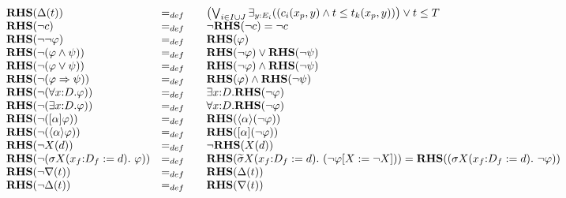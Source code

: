 \documentclass{article}
\begin{document}
\begin{equation*}
\begin{array}{lll}
{\mathbf{RHS}}(\Delta (t)) & =_{def} & \left( \bigvee_{i{\in }I\cup
J}\exists _{y{:}E_{i}}((c_{i}(x_{p},y)\wedge t\leq t_{k}(x_{p},y))\right)
\vee t\leq T \\ 
{\mathbf{RHS}}(\lnot c) & =_{def} & \lnot {\mathbf{RHS}}(\lnot c)=\lnot c \\ 
{\mathbf{RHS}}(\lnot \lnot \varphi ) & =_{def} & \mathbf{RHS}(\varphi ) \\ 
{\mathbf{RHS}}(\lnot (\varphi \wedge \psi )) & =_{def} & {\mathbf{RHS}}%
(\lnot \varphi )\vee {\mathbf{RHS}}(\lnot \psi ) \\ 
{\mathbf{RHS}}(\lnot (\varphi \vee \psi )) & =_{def} & {\mathbf{RHS}}(\lnot
\varphi )\wedge {\mathbf{RHS}}(\lnot \psi ) \\ 
{\mathbf{RHS}}(\lnot (\varphi \Rightarrow \psi )) & =_{def} & {\mathbf{RHS}}%
(\varphi )\wedge {\mathbf{RHS}}(\lnot \psi ) \\ 
{\mathbf{RHS}}(\lnot (\forall {x{:}D}.\varphi )) & =_{def} & \exists {x{:}D}.%
{\mathbf{RHS}}(\lnot \varphi ) \\ 
{\mathbf{RHS}}(\lnot (\exists {x{:}D}.\varphi )) & =_{def} & \forall {x{:}D}.%
{\mathbf{RHS}}(\lnot \varphi ) \\ 
{\mathbf{RHS}}(\lnot ([\alpha ]\varphi )) & =_{def} & {\mathbf{RHS}}(\langle
\alpha \rangle (\lnot \varphi )) \\ 
{\mathbf{RHS}}(\lnot (\langle \alpha \rangle \varphi )) & =_{def} & {\mathbf{%
RHS}}([\alpha ](\lnot \varphi )) \\ 
{\mathbf{RHS}}(\lnot X(d)) & =_{def} & \lnot {\mathbf{RHS}}(X(d)) \\ 
{\mathbf{RHS}}(\lnot (\sigma X(x_{f}{:}D_{f}:=d).~\varphi )) & =_{def}~~~ & {%
\mathbf{RHS}}(\widetilde{\sigma }X(x_{f}{:}D_{f}:=d).~(\lnot \varphi \lbrack
X:=\lnot X]))={\mathbf{RHS}}((\sigma X(x_{f}{:}D_{f}:=d).~\lnot \varphi ))
\\ 
{\mathbf{RHS}}(\lnot \nabla (t)) & =_{def} & {\mathbf{RHS}}(\Delta (t)) \\ 
{\mathbf{RHS}}(\lnot \Delta (t)) & =_{def} & {\mathbf{RHS}}(\nabla (t))%
\end{array}%
\end{equation*}

\pagebreak
\end{document}
